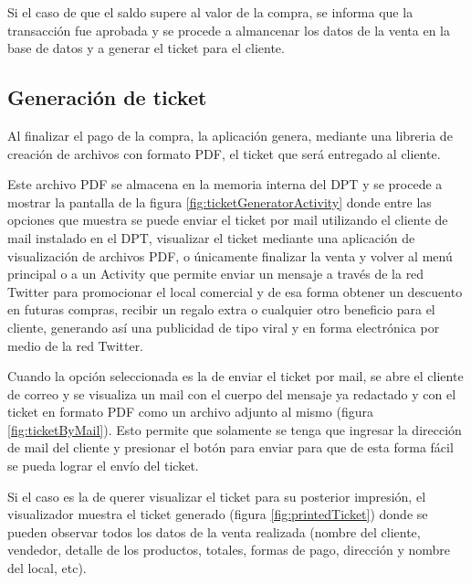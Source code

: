 Si el caso de que el saldo supere al valor de la compra, se informa que la transacci\'on fue aprobada y se procede a almancenar los datos de la venta en la base de datos y a generar el ticket para el cliente.



\subsection{Generaci\'on de ticket}
\label{subsec:ui.addsale.ticket}

Al finalizar el pago de la compra, la aplicaci\'on genera, mediante una libreria de creaci\'on de archivos con formato PDF, el ticket que ser\'a entregado al cliente.

Este archivo PDF se almacena en la memoria interna del \ac{DPT} y se procede a mostrar la pantalla de la figura \ref{fig:ticketGeneratorActivity} donde entre las opciones que muestra se puede enviar el ticket por mail utilizando el cliente de mail instalado en el \ac{DPT}, visualizar el ticket mediante una aplicaci\'on de visualizaci\'on de archivos PDF, o \'unicamente finalizar la venta y volver al men\'u principal o a un Activity que permite enviar un mensaje a trav\'es de la red Twitter para promocionar el local comercial y de esa forma obtener un descuento en futuras compras, recibir un regalo extra o cualquier otro beneficio para el cliente, generando as\'i una publicidad de tipo viral y en forma electr\'onica por medio de la red Twitter.

Cuando la opci\'on seleccionada es la de enviar el ticket por mail, se abre el cliente de correo y se visualiza un mail con el cuerpo del mensaje ya redactado y con el ticket en formato PDF como un archivo adjunto al mismo (figura \ref{fig:ticketByMail}). Esto permite que solamente se tenga que ingresar la direcci\'on de mail del cliente y presionar el bot\'on para enviar para que de esta forma f\'acil se pueda lograr el env\'io del ticket.

Si el caso es la de querer visualizar el ticket para su posterior impresi\'on, el visualizador muestra el ticket generado (figura \ref{fig:printedTicket}) donde se pueden observar todos los datos de la venta realizada (nombre del cliente, vendedor, detalle de los productos, totales, formas de pago, direcci\'on y nombre del local, etc).

